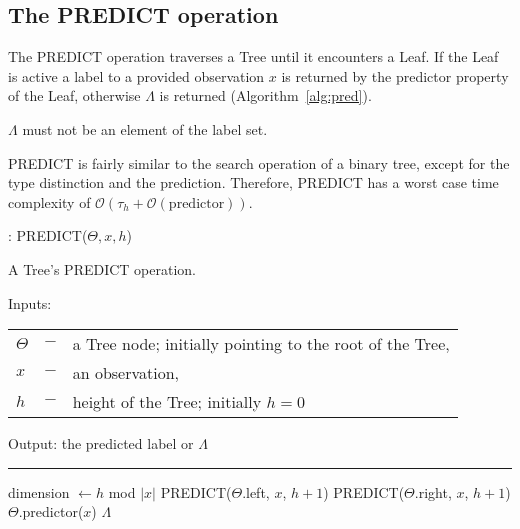 \subsection{The PREDICT operation}

The PREDICT operation traverses a Tree until it encounters
a Leaf. If the Leaf is active a label to a provided
observation $x$ is returned by the predictor
property of the Leaf, otherwise $\Lambda$ is returned
(Algorithm~\ref{alg:pred}).

$\Lambda$ must not be an element of the label set.

PREDICT is fairly similar to the search operation of a
binary tree, except for the type distinction and the
prediction.\cite[chapter 12.2]{Cormen} Therefore, PREDICT
has a worst case time complexity of $\mathcal{O}(\tau_h +
\mathcal{O}(\text{predictor}))$.

\begin{algorithm}
  \caption{: PREDICT($\Theta, x, h$)}%
  \label{alg:pred}
  A Tree's PREDICT operation.

  Inputs:

    \begin{tabu}{llX}
    $\Theta$ &$-$ &a Tree node; initially pointing to the
      root of the Tree,\\
    $x$ &$-$ &an observation,\\
    $h$ &$-$ &height of the Tree; initially $h = 0$
    \end{tabu}

  Output: the predicted label or $\Lambda$

  \noindent\rule{\linewidth}{0.4pt}

  \begin{algorithmic}[1]
      \STATE dimension $\leftarrow h$ mod $|x|$
        \STATE PREDICT($\Theta$.left, $x$, $h + 1$)
      \ELSE
        \STATE PREDICT($\Theta$.right, $x$, $h + 1$)
      \ENDIF
      \RETURN $\Theta$.predictor($x$)
    \ELSE
      \RETURN $\Lambda$
    \ENDIF
  \end{algorithmic}
\end{algorithm}
